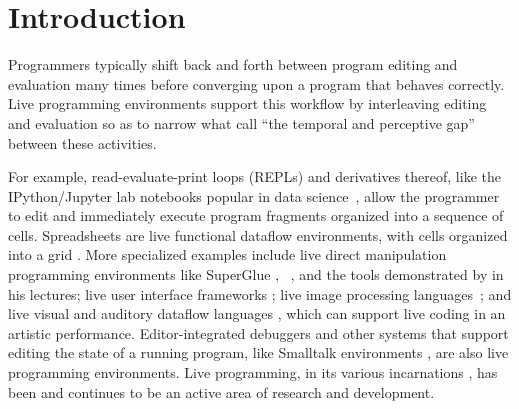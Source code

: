 \vspace{-7px}
\newcommand{\introSec}{Introduction}
\section{\protect\introSec} %
\label{sec:intro}


Programmers typically shift back and forth between program editing and evaluation many times before converging upon a program that behaves correctly. 
Live programming environments support this workflow by interleaving editing and evaluation so as to   
narrow what \citet{burckhardt2013s} call ``the temporal and perceptive gap'' between these activities.

For example, read-evaluate-print loops (REPLs) and derivatives thereof, like the IPython/Jupyter lab notebooks popular in data science~\cite{PER-GRA:2007}, allow the programmer to edit and immediately execute program fragments organized into a sequence of cells. 
Spreadsheets are live functional dataflow environments, with cells organized into a grid \cite{DBLP:journals/jfp/Wakeling07}. 
More specialized examples include live direct manipulation programming environments like SuperGlue
\cite{McDirmid:2007}, \sns{}~\cite{sns-pldi,sns-uist}, and the tools
demonstrated by \citet{victor2012inventing} in his lectures;
%
live user interface frameworks \cite{burckhardt2013s};
%
live image processing languages~\cite{DBLP:journals/vlc/Tanimoto90};
%
and live visual and auditory dataflow languages \cite{DBLP:conf/vl/BurnettAW98}, which can support live coding in an artistic performance.
Editor-integrated debuggers \cite{mccauley2008debugging} and other systems that support editing the state of a running program, like Smalltalk environments \cite{Goldberg:1983cn}, are also live programming environments. 
Live programming, in its various incarnations \cite{DBLP:journals/vlc/Tanimoto90,DBLP:conf/icse/Tanimoto13}, has been and continues to be an active area of research and development.

